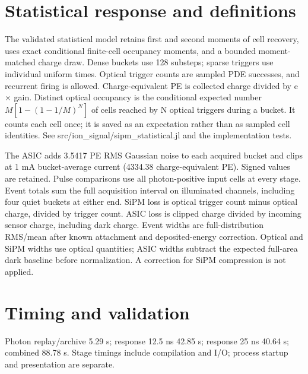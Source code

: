 \documentclass[11pt,a4paper]{article}
\begin{document}
\section*{Statistical response and definitions}
The validated statistical model retains first and second moments of cell recovery, uses exact conditional finite-cell occupancy moments, and a bounded moment-matched charge draw. Dense buckets use 128 substeps; sparse triggers use individual uniform times. Optical trigger counts are sampled PDE successes, and recurrent firing is allowed. Charge-equivalent PE is collected charge divided by e $\times$ gain. Distinct optical occupancy is the conditional expected number $M[1-(1-1/M)^N]$ of cells reached by N optical triggers during a bucket. It counts each cell once; it is saved as an expectation rather than as sampled cell identities. See src/ion\_signal/sipm\_statistical.jl and the implementation tests.

The ASIC adds 3.5417 PE RMS Gaussian noise to each acquired bucket and clips at 1 mA bucket-average current (4334.38 charge-equivalent PE). Signed values are retained. Pulse comparisons use all photon-positive input cells at every stage. Event totals sum the full acquisition interval on illuminated channels, including four quiet buckets at either end. SiPM loss is optical trigger count minus optical charge, divided by trigger count. ASIC loss is clipped charge divided by incoming sensor charge, including dark charge. Event widths are full-distribution RMS/mean after known attachment and deposited-energy correction. Optical and SiPM widths use optical quantities; ASIC widths subtract the expected full-area dark baseline before normalization. A correction for SiPM compression is not applied.
\section*{Timing and validation}
Photon replay/archive 5.29 s; response 12.5 ns 42.85 s; response 25 ns 40.64 s; combined 88.78 s. Stage timings include compilation and I/O; process startup and presentation are separate.
\end{document}
